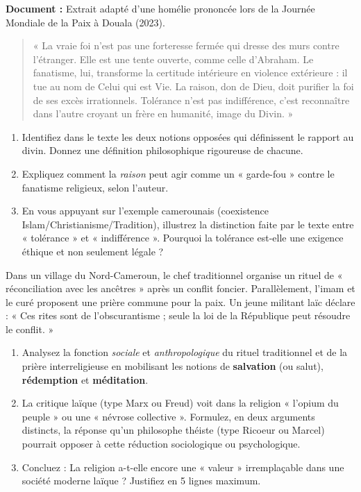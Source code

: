 \documentclass[11pt]{article}
\begin{document}
\begin{exercice}
\textbf{Document :} Extrait adapté d'une homélie prononcée lors de la Journée Mondiale de la Paix à Douala (2023).
\begin{quote}
« La vraie foi n'est pas une forteresse fermée qui dresse des murs contre l'étranger. Elle est une tente ouverte, comme celle d'Abraham. Le fanatisme, lui, transforme la certitude intérieure en violence extérieure : il tue au nom de Celui qui est Vie. La raison, don de Dieu, doit purifier la foi de ses excès irrationnels. Tolérance n'est pas indifférence, c'est reconnaître dans l'autre croyant un frère en humanité, image du Divin. »
\end{quote}

\begin{enumerate}
    \item Identifiez dans le texte les deux notions opposées qui définissent le rapport au divin. Donnez une définition philosophique rigoureuse de chacune.
    \item Expliquez comment la \textit{raison} peut agir comme un « garde-fou » contre le fanatisme religieux, selon l'auteur.
    \item En vous appuyant sur l'exemple camerounais (coexistence Islam/Christianisme/Tradition), illustrez la distinction faite par le texte entre « tolérance » et « indifférence ». Pourquoi la tolérance est-elle une exigence éthique et non seulement légale ?
\end{enumerate}
\end{exercice}

\begin{exercice}
Dans un village du Nord-Cameroun, le chef traditionnel organise un rituel de « réconciliation avec les ancêtres » après un conflit foncier. Parallèlement, l'imam et le curé proposent une prière commune pour la paix. Un jeune militant laïc déclare : « Ces rites sont de l'obscurantisme ; seule la loi de la République peut résoudre le conflit. »

\begin{enumerate}
    \item Analysez la fonction \textit{sociale} et \textit{anthropologique} du rituel traditionnel et de la prière interreligieuse en mobilisant les notions de \textbf{salvation} (ou salut), \textbf{rédemption} et \textbf{méditation}.
    \item La critique laïque (type Marx ou Freud) voit dans la religion « l'opium du peuple » ou une « névrose collective ». Formulez, en deux arguments distincts, la réponse qu'un philosophe théiste (type Ricoeur ou Marcel) pourrait opposer à cette réduction sociologique ou psychologique.
    \item Concluez : La religion a-t-elle encore une « valeur » irremplaçable dans une société moderne laïque ? Justifiez en 5 lignes maximum.
\end{enumerate}
\end{exercice}
\end{document}

